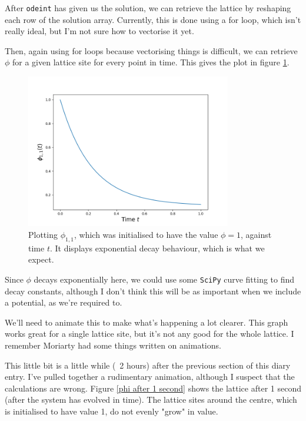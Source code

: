\documentclass{article}
\begin{document}
After \texttt{odeint} has given us the solution, we can retrieve the lattice by reshaping each row of the solution array. Currently, this is done using a for loop, which isn't really ideal, but I'm not sure how to vectorise it yet.

Then, again using for loops because vectorising things is difficult, we can retrieve $\phi$ for a given lattice site for every point in time. This gives the plot in figure \ref{first phi plot}.

\begin{figure}[h!]
	\centering
	\includegraphics[width=0.8\textwidth]{phi_plot.png}
	\caption{\label{first phi plot}Plotting $\phi_{1,1}$, which was initialised to have the value $\phi=1$, against time $t$. It displays exponential decay behaviour, which is what we expect.}
\end{figure}

Since $\phi$ decays exponentially here, we could use some \texttt{SciPy} curve fitting to find decay constants, although I don't think this will be as important when we include a potential, as we're required to.

\medskip

We'll need to animate this to make what's happening a lot clearer. This graph works great for a single lattice site, but it's not any good for the whole lattice. I remember Moriarty had some things written on animations.

\medskip

This little bit is a little while (~2 hours) after the previous section of this diary entry. I've pulled together a rudimentary animation, although I suspect that the calculations are wrong. Figure \ref{phi after 1 second} shows the lattice after 1 second (after the system has evolved in time). The lattice sites around the centre, which is initialised to have value 1, do not evenly "grow" in value.
\end{document}
